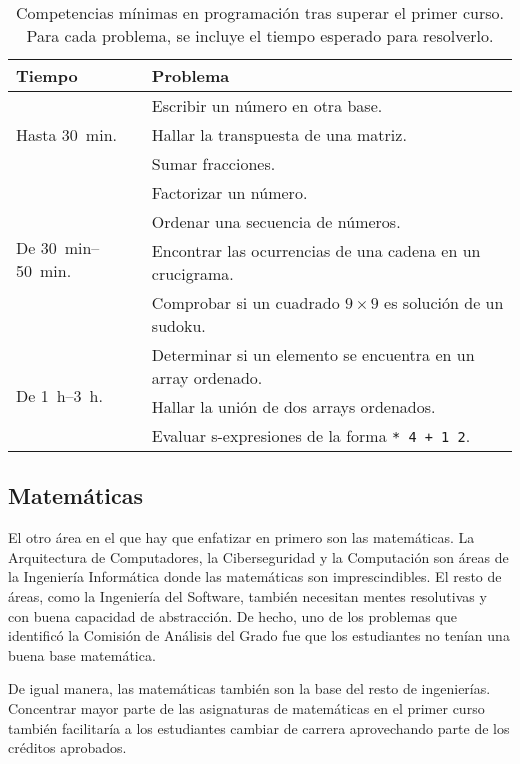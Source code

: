 \begin{table}[h]
    \centering
    \begin{tabular}{ll}
        \textbf{Tiempo} & \textbf{Problema} \\
        \hline
        \multirow{3}{*}{Hasta \SI{30}{min}.}
        & Escribir un número en otra base. \\
        & Hallar la transpuesta de una matriz. \\
        & Sumar fracciones. \\
        \hline
        \multirow{4}{*}{De \SIrange{30}{50}{min}.}
        & Factorizar un número. \\
        & Ordenar una secuencia de números. \\
        & Encontrar las ocurrencias de una cadena en un crucigrama. \\
        & Comprobar si un cuadrado $9\times 9$ es solución de un sudoku. \\
        \hline
        \multirow{3}{*}{De \SIrange{1}{3}{h}.}
        & Determinar si un elemento se encuentra en un array ordenado. \\
        & Hallar la unión de dos arrays ordenados. \\
        & Evaluar s-expresiones de la forma \lstinline!* 4 + 1 2!.
    \end{tabular}
    \caption{
        Competencias mínimas en programación tras superar el primer curso.
        Para cada problema, se incluye el tiempo esperado para resolverlo.
    }
    \label{tab:first-course-programming-examples}
\end{table}

\subsection{Matemáticas}

El otro área en el que hay que enfatizar en primero son las matemáticas.
La Arquitectura de Computadores, la Ciberseguridad y la Computación
son áreas de la Ingeniería Informática donde
las matemáticas son imprescindibles.
El resto de áreas, como la Ingeniería del Software,
también necesitan mentes resolutivas y con buena capacidad de abstracción.
De hecho, uno de los problemas que
identificó la Comisión de Análisis del Grado
fue que los estudiantes no tenían una buena base matemática.

De igual manera,
las matemáticas también son la base del resto de ingenierías.
Concentrar mayor parte de las asignaturas de matemáticas en el primer curso
también facilitaría a los estudiantes cambiar de carrera
aprovechando parte de los créditos aprobados.

